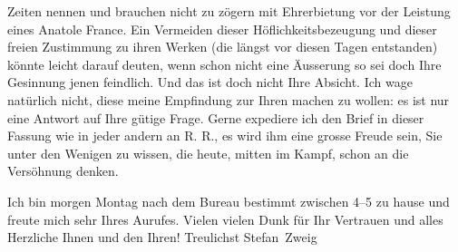                Zeiten nennen und brauchen nicht zu zögern mit Ehrerbietung vor der Leistung eines
                  Anatole France. Ein Vermeiden dieser
               Höflichkeitsbezeugung und dieser freien Zustimmung zu ihren Werken (die längst vor
               diesen Tagen entstanden) könnte leicht darauf deuten, wenn schon nicht eine Äusserung
               so sei doch Ihre Gesinnung jenen feindlich. Und das ist doch nicht Ihre Absicht. Ich
               wage natürlich nicht, diese meine Empfindung zur Ihren machen zu wollen: es ist nur
               eine Antwort auf Ihre gütige Frage. Gerne expediere ich den {\pb}Brief in dieser Fassung wie in jeder andern an R. R., es wird ihm eine grosse Freude sein, Sie
               unter den Wenigen zu wissen, die heute, mitten im Kampf, schon an die Versöhnung
               denken.\pend
           
\pstart
           Ich bin morgen Montag nach dem Bureau bestimmt zwischen 4–5 zu hause und freute mich sehr Ihres Aurufes.
               Vielen vielen Dunk für Ihr Vertrauen und alles Herzliche Ihnen und den Ihren!
               Treulichst\pend
           \pstart \spacefill\mbox{Stefan Zweig}\pend{}\endnumbering{}
\begin{anhang}
\end{anhang}
      